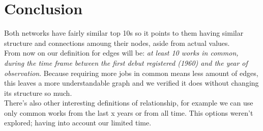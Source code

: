 \section{Conclusion}
Both networks have fairly similar top 10s so it points to them having similar structure and connections amoung their nodes, aside from actual values.\\

From now on our definition for edges will be: \textit{at least 10 works in common, during the time frame between the first debut registered (1960) and the year of observation}. Because requiring more jobs in common means less amount of edges, this leaves a more understandable graph and we verified it does without changing its structure so much.\\

There's also other interesting definitions of relationship, for example we can use only common works from the last x years or from all time. This options weren't explored; having into account our limited time.\\


